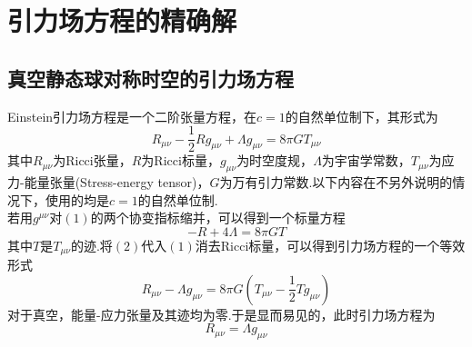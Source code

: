 \section{引力场方程的精确解}\label{sec:exact solutions}
	\subsection{真空静态球对称时空的引力场方程}
        Einstein引力场方程是一个二阶张量方程，在$c=1$的自然单位制下，其形式为
        \begin{equation}
            R_{\mu\nu}-\frac{1}{2}Rg_{\mu\nu}+\Lambda g_{\mu\nu}=8\pi GT_{\mu\nu}
        \end{equation}
        其中$R_{\mu\nu}$为Ricci张量，$R$为Ricci标量，$g_{\mu\nu}$为时空度规，$\Lambda$为宇宙学常数，$T_{\mu\nu}$为应力-能量张量(Stress-energy tensor)，$G$为万有引力常数.以下内容在不另外说明的情况下，使用的均是$c=1$的自然单位制.\\
        若用$g^{\mu\nu}$对$(1)$的两个协变指标缩并，可以得到一个标量方程
        \begin{equation}
            -R+4\Lambda=8\pi GT
        \end{equation}
        其中$T$是$T_{\mu\nu}$的迹.将$(2)$代入$(1)$消去Ricci标量，可以得到引力场方程的一个等效形式
        \begin{equation}
            R_{\mu\nu}-\Lambda g_{\mu\nu}=8\pi G(T_{\mu\nu}-\frac{1}{2}Tg_{\mu\nu})
        \end{equation}
        对于真空，能量-应力张量及其迹均为零.于是显而易见的，此时引力场方程为
        \begin{equation}
            R_{\mu\nu}=\Lambda g_{\mu\nu}
        \end{equation}



